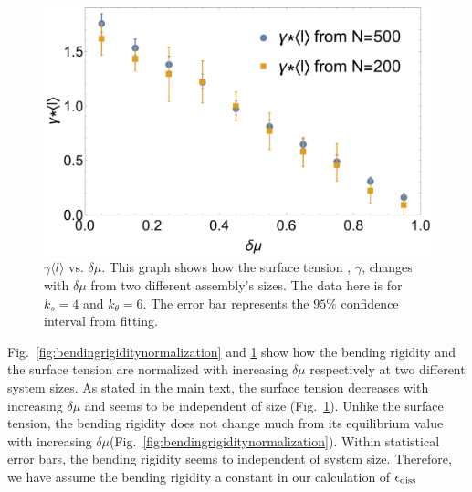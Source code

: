 \documentclass[amsmath,preprintnumbers,10pt,nofootinbib,prl,twocolumn]{revtex4-1}
\begin{document}
\begin{figure}[tbb]
\centering
\includegraphics[scale=0.27]{Fig8.pdf}
\caption{$\gamma\langle l \rangle$ vs. $\delta\mu$. This graph shows how the surface tension , $\gamma$, changes with $\delta\mu$ from two different assembly's sizes. The data here is for $k_s=4$ and $k_\theta = 6$. The error bar represents the $95\%$ confidence interval from fitting.} \label{fig:surfacetensionynormalization}
\end{figure}

Fig.~\ref{fig:bendingrigiditynormalization} and \ref{fig:surfacetensionynormalization} show how the bending rigidity and the surface tension are normalized with increasing $\delta\mu$ respectively at two different system sizes. As stated in the main text, the surface tension decreases with increasing $\delta\mu$ and seems to be independent of size (Fig.~\ref{fig:surfacetensionynormalization}). Unlike the surface tension, the bending rigidity does not change much from its equilibrium value with increasing $\delta\mu$(Fig.~\ref{fig:bendingrigiditynormalization}). Within statistical error bars, the bending rigidity seems to independent of system size. Therefore, we have assume the bending rigidity a constant in our calculation of $\epsilon_{\rm{diss}}$
\end{document}
